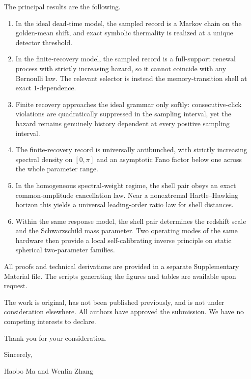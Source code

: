 \documentclass[11pt]{article}
\begin{document}
The principal results are the following.
\begin{enumerate}
\item In the ideal dead-time model, the sampled record is a Markov chain on the golden-mean shift, and exact symbolic thermality is realized at a unique detector threshold.
\item In the finite-recovery model, the sampled record is a full-support renewal process with strictly increasing hazard, so it cannot coincide with any Bernoulli law. The relevant selector is instead the memory-transition shell at exact $1$-dependence.
\item Finite recovery approaches the ideal grammar only softly: consecutive-click violations are quadratically suppressed in the sampling interval, yet the hazard remains genuinely history dependent at every positive sampling interval.
\item The finite-recovery record is universally antibunched, with strictly increasing spectral density on $[0,\pi]$ and an asymptotic Fano factor below one across the whole parameter range.
\item In the homogeneous spectral-weight regime, the shell pair obeys an exact common-amplitude cancellation law. Near a nonextremal Hartle--Hawking horizon this yields a universal leading-order ratio law for shell distances.
\item Within the same response model, the shell pair determines the redshift scale and the Schwarzschild mass parameter. Two operating modes of the same hardware then provide a local self-calibrating inverse principle on static spherical two-parameter families.
\end{enumerate}

All proofs and technical derivations are provided in a separate Supplementary Material file. The scripts generating the figures and tables are available upon request.

The work is original, has not been published previously, and is not under consideration elsewhere. All authors have approved the submission. We have no competing interests to declare.

Thank you for your consideration.

Sincerely,

Haobo Ma and Wenlin Zhang
\end{document}
